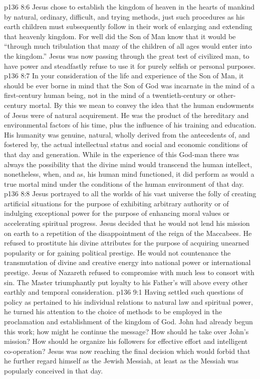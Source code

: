 \vs p136 8:6 Jesus chose to establish the kingdom of heaven in the hearts of mankind by natural, ordinary, difficult, and trying methods, just such procedures as his earth children must subsequently follow in their work of enlarging and extending that heavenly kingdom. For well did the Son of Man know that it would be “through much tribulation that many of the children of all ages would enter into the kingdom.” Jesus was now passing through the great test of civilized man, to have power and steadfastly refuse to use it for purely selfish or personal purposes.
\vs p136 8:7 \pc In your consideration of the life and experience of the Son of Man, it should be ever borne in mind that the Son of God was incarnate in the mind of a first\hyp{}century human being, not in the mind of a twentieth\hyp{}century or other\hyp{}century mortal. By this we mean to convey the idea that the human endowments of Jesus were of natural acquirement. He was the product of the hereditary and environmental factors of his time, plus the influence of his training and education. His humanity was genuine, natural, wholly derived from the antecedents of, and fostered by, the actual intellectual status and social and economic conditions of that day and generation. While in the experience of this God\hyp{}man there was always the possibility that the divine mind would transcend the human intellect, nonetheless, when, and as, his human mind functioned, it did perform as would a true mortal mind under the conditions of the human environment of that day.
\vs p136 8:8 \pc Jesus portrayed to all the worlds of his vast universe the folly of creating artificial situations for the purpose of exhibiting arbitrary authority or of indulging exceptional power for the purpose of enhancing moral values or accelerating spiritual progress. Jesus decided that he would not lend his mission on earth to a repetition of the disappointment of the reign of the Maccabees. He refused to prostitute his divine attributes for the purpose of acquiring unearned popularity or for gaining political prestige. He would not countenance the transmutation of divine and creative energy into national power or international prestige. Jesus of Nazareth refused to compromise with  much less to consort with sin. The Master triumphantly put loyalty to his Father’s will above every other earthly and temporal consideration.
\vs p136 9:1 Having settled such questions of policy as pertained to his individual relations to natural law and spiritual power, he turned his attention to the choice of methods to be employed in the proclamation and establishment of the kingdom of God. John had already begun this work; how might he continue the message? How should he take over John’s mission? How should he organize his followers for effective effort and intelligent co\hyp{}operation? Jesus was now reaching the final decision which would forbid that he further regard himself as the Jewish Messiah, at least as the Messiah was popularly conceived in that day.
